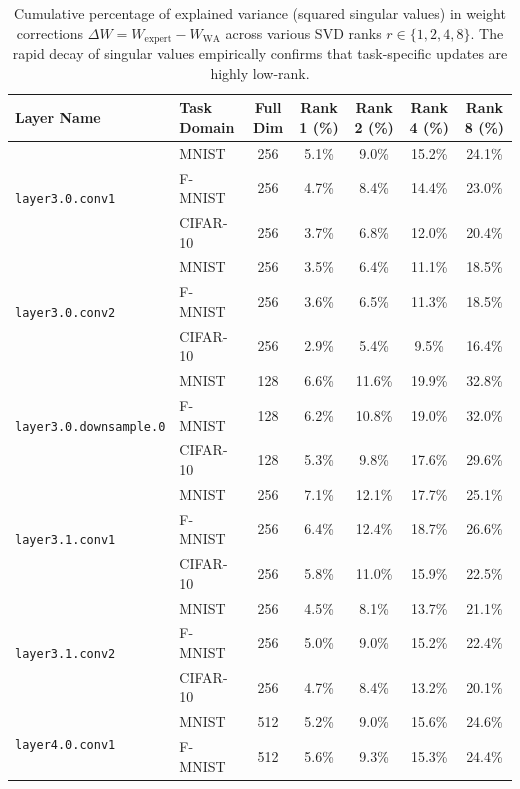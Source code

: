 \documentclass{article}
\theoremstyle{plain}
\theoremstyle{definition}
\theoremstyle{remark}
\begin{document}
\begin{table}[t]
\caption{Cumulative percentage of explained variance (squared singular values) in weight corrections $\Delta W = W_{\text{expert}} - W_{\text{WA}}$ across various SVD ranks $r \in \{1, 2, 4, 8\}$. The rapid decay of singular values empirically confirms that task-specific updates are highly low-rank.}
\label{tab:svd_decay_analysis}
\vskip 0.15in
\begin{center}
\begin{small}
\begin{tabular}{llccccc}
\toprule
Layer Name & Task Domain & Full Dim & Rank 1 (\%) & Rank 2 (\%) & Rank 4 (\%) & Rank 8 (\%) \\
\midrule
\multirow{3}{*}{\texttt{layer3.0.conv1}} 
& MNIST & 256 & 5.1\% & 9.0\% & 15.2\% & 24.1\% \\
& F-MNIST & 256 & 4.7\% & 8.4\% & 14.4\% & 23.0\% \\
& CIFAR-10 & 256 & 3.7\% & 6.8\% & 12.0\% & 20.4\% \\
\hline
\multirow{3}{*}{\texttt{layer3.0.conv2}} 
& MNIST & 256 & 3.5\% & 6.4\% & 11.1\% & 18.5\% \\
& F-MNIST & 256 & 3.6\% & 6.5\% & 11.3\% & 18.5\% \\
& CIFAR-10 & 256 & 2.9\% & 5.4\% & 9.5\% & 16.4\% \\
\hline
\multirow{3}{*}{\texttt{layer3.0.downsample.0}} 
& MNIST & 128 & 6.6\% & 11.6\% & 19.9\% & 32.8\% \\
& F-MNIST & 128 & 6.2\% & 10.8\% & 19.0\% & 32.0\% \\
& CIFAR-10 & 128 & 5.3\% & 9.8\% & 17.6\% & 29.6\% \\
\hline
\multirow{3}{*}{\texttt{layer3.1.conv1}} 
& MNIST & 256 & 7.1\% & 12.1\% & 17.7\% & 25.1\% \\
& F-MNIST & 256 & 6.4\% & 12.4\% & 18.7\% & 26.6\% \\
& CIFAR-10 & 256 & 5.8\% & 11.0\% & 15.9\% & 22.5\% \\
\hline
\multirow{3}{*}{\texttt{layer3.1.conv2}} 
& MNIST & 256 & 4.5\% & 8.1\% & 13.7\% & 21.1\% \\
& F-MNIST & 256 & 5.0\% & 9.0\% & 15.2\% & 22.4\% \\
& CIFAR-10 & 256 & 4.7\% & 8.4\% & 13.2\% & 20.1\% \\
\hline
\multirow{3}{*}{\texttt{layer4.0.conv1}} 
& MNIST & 512 & 5.2\% & 9.0\% & 15.6\% & 24.6\% \\
& F-MNIST & 512 & 5.6\% & 9.3\% & 15.3\% & 24.4\% \\

\end{tabular}
\end{small}
\end{center}
\end{table}
\end{document}
